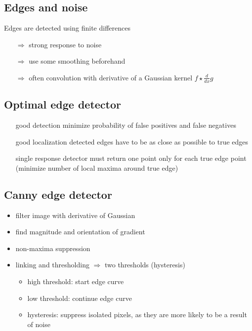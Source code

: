 \documentclass[12pt]{article}
\begin{document}
	\subsection{Edges and noise}
	Edges are detected using finite differences 
	\begin{itemize}
		\item[$\Rightarrow$] strong response to noise
		\item[$\Rightarrow$] use some smoothing beforehand
		\item[$\Rightarrow$] often convolution with derivative of a Gaussian kernel $f \star \frac{d}{dx}g$
	\end{itemize} 

	\subsection{Optimal edge detector}
	\begin{itemize}
		\item[good detection] minimize probability of false positives and false negatives
		\item[good localization] detected edges have to be as close as possible to true edges
		\item[single response] detector must return one point only for each true edge point (minimize number of local maxima around true edge)
	\end{itemize}

	\subsection{Canny edge detector}
	\begin{itemize}
		\item filter image with derivative of Gaussian
		\item find magnitude and orientation of gradient
		\item non-maxima suppression
		\item linking and thresholding $\Rightarrow$ two thresholds (hysteresis)
			\begin{itemize}
				\item high threshold: start edge curve
				\item low threshold: continue edge curve
				\item hysteresis: suppress isolated pixels, as they are more likely to be a result of noise
			\end{itemize}
	\end{itemize}
\end{document}
